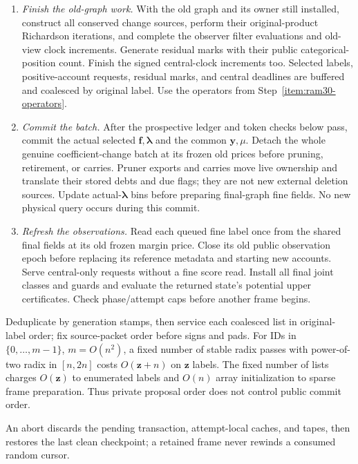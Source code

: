 \documentclass[11pt]{article}
\theoremstyle{remark}
\newcommand{\ff}{\mathbf f}
\newcommand{\llambda}{\boldsymbol{\lambda}}
\newcommand{\yy}{\mathbf y}
\newcommand{\zz}{\mathbf z}
\begin{document}
\begin{enumerate}
\item \emph{Finish the old-graph work.}\label{item:ram30-old-work}
With the old graph and its owner still installed, construct all conserved change
sources, perform their original-product Richardson iterations, and complete the
observer filter evaluations and old-view clock increments.
Generate residual marks with their public categorical-position count.
Finish the signed central-clock increments too.
Selected labels, positive-account requests, residual marks, and central
deadlines are buffered and coalesced by original label.
Use the operators from Step~\ref{item:ram30-operators}.

\item \emph{Commit the batch.}\label{item:ram30-commit}
After the prospective ledger and token checks below pass, commit the actual
selected $\ff,\llambda$ and the common $\yy,\mu$.
Detach the whole genuine coefficient-change batch at its frozen old prices
before pruning, retirement, or carries.
Pruner exports and carries move live ownership and translate their stored debts
and due flags; they are not new external deletion sources.
Update actual-$\llambda$ bins before preparing final-graph fine fields.
No new physical query occurs during this commit.

\item \emph{Refresh the observations.}\label{item:ram30-refresh}
Read each queued fine label once from the shared final fields at its old frozen
margin price.
Close its old public observation epoch before replacing its reference metadata
and starting new accounts.
Serve central-only requests without a fine score read.
Install all final joint classes and guards and evaluate the returned state's
potential upper certificates.
Check phase/attempt caps before another frame begins.
\end{enumerate}

Deduplicate by generation stamps, then service each coalesced list in
original-label order; fix source-packet order before signs and pads.
For IDs in $\{0,\ldots,m-1\}$, $m=O(n^2)$, a fixed number of stable radix passes
with power-of-two radix in $[n,2n]$ costs $O(\zz+n)$ on $\zz$ labels.
The fixed number of lists charges $O(\zz)$ to enumerated labels and $O(n)$ array
initialization to sparse frame preparation.
Thus private proposal order does not control public commit order.

An abort discards the pending transaction, attempt-local caches, and tapes, then
restores the last clean checkpoint; a retained frame never rewinds a consumed
random cursor.
\end{document}
